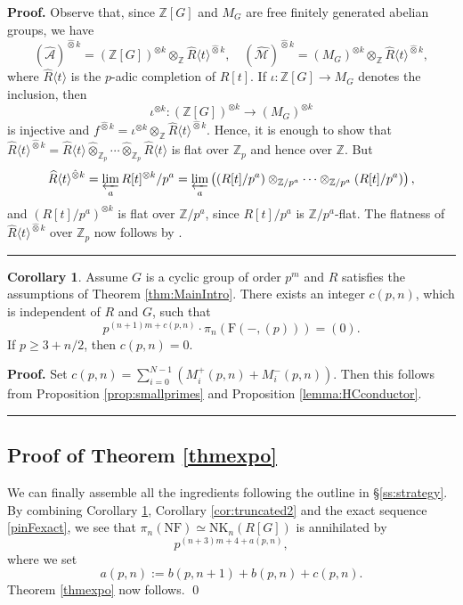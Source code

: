 \documentclass[reqno,11pt,letterpaper]{amsart}
\theoremstyle{plain}
\numberwithin{equation}{subsection}
\newtheorem{corollary}[equation]{Corollary}
\theoremstyle{remark}
\theoremstyle{plain}
\theoremstyle{definition}\newtheorem*{notation}{Notation}
\newcommand{\A}{{\mathcal A}}
\newcommand{\M}{{\mathcal M}}
\newcommand{\lan}{\langle}
\newcommand{\ran}{\rangle}
\newtheorem{corollary}[theorem]{Corollary}
\newenvironment{proof}[1][Proof]{\noindent\textbf{#1.} }{\ \rule{0.5em}{0.5em}}
\newcommand{\RF}{\mathrm{F}}
\newcommand{\RNF}{\mathrm{NF}}
\newcommand{\RNK}{\mathrm{NK}}
\newcommand{\BZ}{\mathbb{Z}}
\newcommand{\wh}{\widehat}
\begin{document}
 \begin{proof} Observe that, since $\BZ[G]$ and $M_G$ are free finitely generated abelian groups, we have
 \[
  (\wh \A)^{\hat\otimes k}=(\BZ[G])^{\otimes k}\otimes_{\BZ} \wh R\lan t\ran^{\hat\otimes k}, \quad   (\wh \M)^{\hat\otimes k}=(M_G)^{\otimes k}\otimes_{\BZ} \wh R\lan t\ran^{\hat\otimes k},
 \]
where $\wh R\lan t\ran$ is the $p$-adic completion of $R[t]$. If $\iota: \BZ[G]\to M_G$ denotes the inclusion, then
\[
\iota^{\otimes k}: (\BZ[G])^{\otimes k}\xrightarrow{\ } (M_G)^{\otimes k}
\]
is injective and 
$ f^{\hat \otimes k}=\iota^{\otimes k}\otimes_{\BZ}\wh R\lan t\ran^{\hat\otimes k}$.
Hence, it is enough to show that $\wh R\lan t\ran^{\hat\otimes k}=\wh R\lan t\ran\hat\otimes_{\BZ_p} \cdots \hat\otimes_{\BZ_p}\wh R\lan t\ran$ is  flat over $\BZ_p$ and hence over $\BZ$. But
\[
\wh R\lan t\ran^{\hat\otimes k}=\varprojlim_a  R[ t]^{\otimes k}/p^a=\varprojlim_a \left((R[t]/p^a)\otimes_{\BZ/p^a}\cdots\otimes_{\BZ/p^a} (R[t]/p^a)\right),
\]
 and $(R[t]/p^a)^{\otimes k}$ is flat over $\BZ/p^a$, since $R[t]/p^a$ is $\BZ/p^a$-flat. The flatness of $\wh R\lan t\ran^{\hat\otimes k}$ over $\BZ_p$ now follows by
\cite[Lemma 15.27.4]{StacksProj}.
 \end{proof}

 
 
 
 
 


 \begin{corollary}\label{cd2} Assume $G$ is a cyclic group of order $p^m$ and $R$ satisfies the assumptions of Theorem \ref{thm:MainIntro}. 
 There exists an integer $c(p, n)$, which is independent of $R$ and $G$, such that 
\[
p^{(n+1)m+c(p, n)}\cdot \pi_n(\RF(-, (p))) =(0).
\]
If $p\geq 3+n/2$,  then $c(p, n)=0$. \end{corollary}
\begin{proof}
Set $c(p,n)=\sum_{i=0}^{N-1}(M^+_i(p, n)+M^-_i(p,n))$. Then this follows from Proposition \ref{prop:smallprimes} and Proposition \ref{lemma:HCconductor}.
\end{proof}
 
 
  
\subsection{Proof of Theorem \ref{thmexpo}}\label{ss:Finale} We can finally assemble all the ingredients following the outline in \S \ref{ss:strategy}. By combining Corollary \ref{cd2}, Corollary 
\ref{cor:truncated2} and the exact sequence \eqref{pinFexact}, we see that $\pi_n(\RNF)\simeq \RNK_n(R[G])$ is annihilated by
\[
p^{(n+3)m+4+a(p,n)},
\]
where we set
\[
a(p, n):=b(p, n+1)+b(p,n)+c(p,n).
\]
 Theorem \ref{thmexpo} now follows. \qed
 
\end{document}
